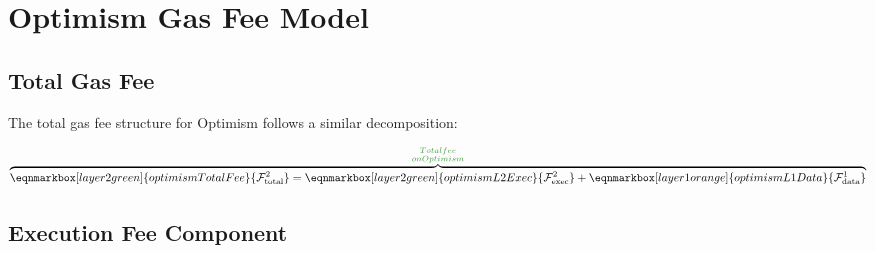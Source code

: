\documentclass[letterpaper,10pt]{article} %
\newcommand{\fee}[2]{\mathcal{F}_{#1}^{#2}}
\begin{document}
\section{Optimism Gas Fee Model} %

\subsection{Total Gas Fee} %

The total gas fee structure for Optimism follows a similar decomposition:
\vspace{2.5cm} %

\begin{equation}
    \label{eq:optimism_total_fee}
    \overbrace{
        \eqnmarkbox[layer2green]{optimismTotalFee}{\fee{\text{total}}{2}} = 
        \eqnmarkbox[layer2green]{optimismL2Exec}{\fee{\text{exec}}{2}} + 
        \eqnmarkbox[layer1orange]{optimismL1Data}{\fee{\text{data}}{1}}
    }^{\substack{\textcolor{layer2green!85}{Total fee} \\ \textcolor{layer2green!85}{on Optimism} }}
\end{equation}


\subsection{Execution Fee Component} %
\end{document}
